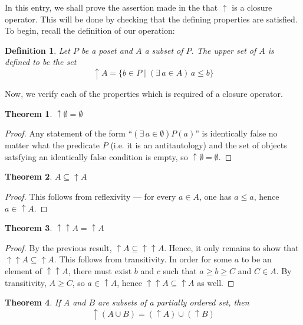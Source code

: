 \documentclass[12pt]{article}
\newcommand{\up}{\uparrow\!\!}
\newtheorem{definition}{Definition}
\newtheorem{theorem}{Theorem}
\begin{document}
In this entry, we shall prove the assertion made in
the  that $\uparrow$
is a closure operator.  This will be done by checking 
that the defining properties are satisfied.  To begin,
recall the definition of our operation:

\begin{definition}
Let $P$ be a poset and $A$ a subset of $P$. The \emph{upper set} 
of $A$ is defined to be the set
\[
\up A = \lbrace b \in P \mid (\exists \, a \in A) \, 
a \le b \rbrace
\]
\end{definition}

Now, we verify each of the properties which is required
of a closure operator.

\begin{theorem}
$\up \emptyset = \emptyset$
\end{theorem}

\begin{proof}
Any statement of the form ``$(\exists \, a \in \emptyset) P(a)$'' 
is identically false no matter what the predicate $P$ (i.e. it is 
an antitautology) and the set of objects satsfying an identically
false condition is empty, so $\up \emptyset = \emptyset$.
\end{proof}

\begin{theorem}
$A\subseteq \up A$
\end{theorem}

\begin{proof}
This follows from reflexivity --- for every $a \in A$, one has
$a \le a$, hence $a \in \up A$.
\end{proof}

\begin{theorem}
$\uparrow \up A=\up A$
\end{theorem}

\begin{proof}
By the previous result, $\up A \subseteq \uparrow \up A$.  Hence, 
it only remains to show that $\uparrow \up A \subseteq \up A$.
This follows from transitivity.  In order for some $a$ to
be an element of $\uparrow \up A$, there must exist $b$ and $c$
such that $a \ge b \ge C$ and $C \in A$.  By transitivity, $A \ge C$,
so $a \in \up A$, hence $\uparrow \up A \subseteq \up A$ as well.
\end{proof}

\begin{theorem}
If $A$ and $B$ are subsets of a partially ordered set, then
\[
\up (A \cup B) = (\up A) \cup (\up B)
\]
\end{theorem}
\end{document}
